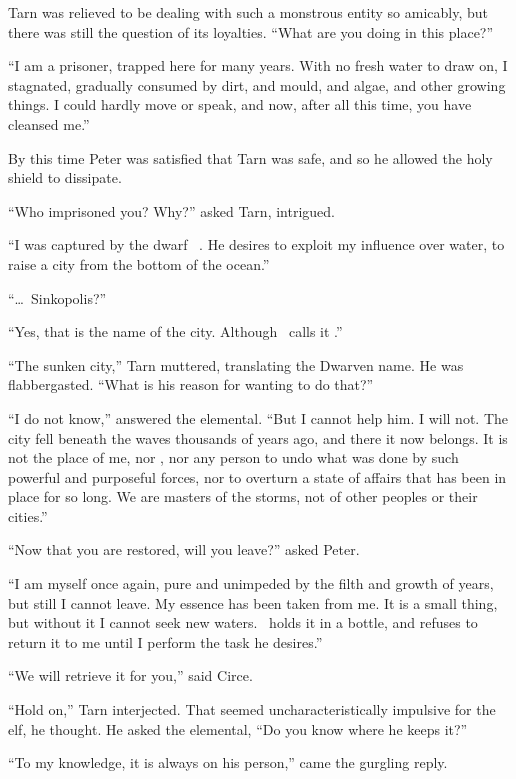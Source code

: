Tarn was relieved to be dealing with such a monstrous entity so amicably, but there was still the question of its loyalties. ``What are you doing in this place?''  

``I am a prisoner, trapped here for many years.  With no fresh water to draw on, I stagnated, gradually consumed by dirt, and mould, and algae, and other growing things.  I could hardly move or speak, and now, after all this time, you have cleansed me.''

By this time Peter was satisfied that Tarn was safe, and so he allowed the holy shield to dissipate.

``Who imprisoned you?  Why?''  asked Tarn, intrigued.

``I was captured by the dwarf \mothzam\ \driktur.  He desires to exploit my influence over water, to raise a city from the bottom of the ocean.''

``\ldots\ Sinkopolis?''

``Yes, that is the name of the city.  Although \mothzam\ calls it \valdunmir.''

``The sunken city,'' Tarn muttered, translating the Dwarven name.  He was flabbergasted. ``What is his reason for wanting to do that?''

``I do not know,'' answered the elemental.  ``But I cannot help him.  I will not.  The city fell beneath the waves thousands of years ago, and there it now belongs.  It is not the place of me, nor \mothzam, nor any person to undo what was done by such powerful and purposeful forces, nor to overturn a state of affairs that has been in place for so long.  We are masters of the storms, not of other peoples or their cities.''

``Now that you are restored, will you leave?'' asked Peter.

``I am myself once again, pure and unimpeded by the filth and growth of years, but still I cannot leave.  My essence has been taken from me.  It is a small thing, but without it I cannot seek new waters.  \mothzam\ holds it in a bottle, and refuses to return it to me until I perform the task he desires.''

``We will retrieve it for you,'' said Circe.

``Hold on,'' Tarn interjected.  That seemed uncharacteristically impulsive for the elf, he thought.  He asked the elemental, ``Do you know where he keeps it?''

``To my knowledge, it is always on his person,'' came the gurgling reply.

